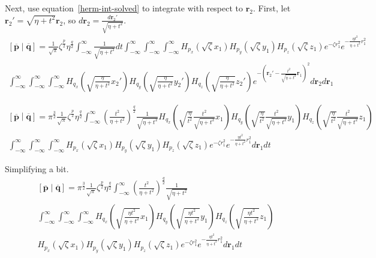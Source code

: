 \documentclass{article}
\begin{document}
Next, use equation~\ref{herm-int-solved} to integrate with respect to $\mathbf{r}_2$. First, let $\mathbf{r}_2' = \sqrt{\eta + t^2}\mathbf{r}_2$, so $d\mathbf{r}_2 = \frac{d\mathbf{r}_2'}{\sqrt{\eta + t^2}}$.
\begin{multline}
  \left[\overline{\mathbf{p}}\middle|\overline{\mathbf{q}}\right] = \frac{1}{\sqrt{\pi}} \zeta^{\frac{p}{2}} \eta^{\frac{q}{2}} \int_{-\infty}^\infty \frac{1}{\sqrt{\eta + t^2}} dt \int_{-\infty}^\infty \int_{-\infty}^\infty \int_{-\infty}^\infty H_{p_x}\left(\sqrt{\zeta} x_1\right) H_{p_y}\left(\sqrt{\zeta} y_1\right) H_{p_z}\left(\sqrt{\zeta} z_1\right) e^{-\zeta r_1^2}e^{-\frac{\eta t^2}{\eta + t^2}r_1^2} \\
  \int_{-\infty}^\infty \int_{-\infty}^\infty \int_{-\infty}^\infty H_{q_x}\left(\sqrt{\frac{\eta}{\eta + t^2}}x_2'\right)H_{q_y}\left(\sqrt{\frac{\eta}{\eta + t^2}}y_2'\right)H_{q_z}\left(\sqrt{\frac{\eta}{\eta + t^2}}z_2'\right) e^{-\left(\mathbf{r}_2' - \frac{t^2}{\sqrt{\eta + t^2}}\mathbf{r}_1\right)^2} d\mathbf{r}_2 d\mathbf{r}_1
\end{multline}

\begin{multline}
  \left[\overline{\mathbf{p}}\middle|\overline{\mathbf{q}}\right] = \pi^{\frac{3}{2}} \frac{1}{\sqrt{\pi}} \zeta^{\frac{p}{2}} \eta^{\frac{q}{2}} \int_{-\infty}^\infty \left(\frac{t^2}{\eta + t^2}\right)^{\frac{q}{2}} \frac{1}{\sqrt{\eta + t^2}} H_{q_x}\left(\sqrt{\frac{\eta}{t^2}}\frac{t^2}{\sqrt{\eta + t^2}} x_1\right) H_{q_y}\left(\sqrt{\frac{\eta}{t^2}}\frac{t^2}{\sqrt{\eta + t^2}} y_1\right)H_{q_z}\left(\sqrt{\frac{\eta}{t^2}}\frac{t^2}{\sqrt{\eta + t^2}} z_1\right)\\
  \int_{-\infty}^\infty \int_{-\infty}^\infty \int_{-\infty}^\infty H_{p_x}\left(\sqrt{\zeta} x_1\right) H_{p_y}\left(\sqrt{\zeta} y_1\right) H_{p_z}\left(\sqrt{\zeta} z_1\right) e^{-\zeta r_1^2}e^{-\frac{\eta t^2}{\eta + t^2}r_1^2} d\mathbf{r}_1 dt  
\end{multline}

Simplifying a bit.
\begin{multline}
  \left[\overline{\mathbf{p}}\middle|\overline{\mathbf{q}}\right] = \pi^{\frac{3}{2}} \frac{1}{\sqrt{\pi}} \zeta^{\frac{p}{2}} \eta^{\frac{q}{2}} \int_{-\infty}^\infty \left(\frac{t^2}{\eta + t^2}\right)^{\frac{q}{2}}\frac{1}{\sqrt{\eta + t^2}}\\
  \int_{-\infty}^\infty \int_{-\infty}^\infty \int_{-\infty}^\infty H_{q_x}\left(\sqrt{\frac{\eta t^2}{\eta + t^2}}x_1\right)H_{q_y}\left(\sqrt{\frac{\eta t^2}{\eta + t^2}} y_1\right)H_{q_z}\left(\sqrt{\frac{\eta t^2}{\eta + t^2}}z_1\right)\\
   H_{p_x}\left(\sqrt{\zeta} x_1\right) H_{p_y}\left(\sqrt{\zeta} y_1\right) H_{p_z}\left(\sqrt{\zeta} z_1\right) e^{-\zeta r_1^2}e^{-\frac{\eta t^2}{\eta + t^2}r_1^2} d\mathbf{r}_1 dt  
\end{multline}
\end{document}
